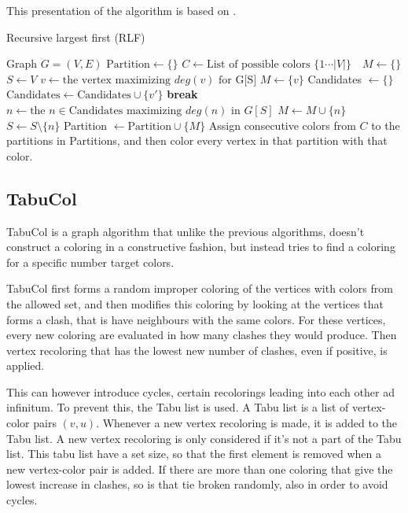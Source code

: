 \documentclass[a4paper]{article}
\newcommand{\algorithmicbreak}{\textbf{break}}
\newcommand{\BREAK}{\STATE \algorithmicbreak}
\begin{document}
This presentation of the algorithm is based on \cite{Constructive}.
\begin{algorithm}[H]
    \caption{Recursive largest first (RLF)}
  \begin{algorithmic}[1]
      \REQUIRE Graph $G = (V,E)$
      \STATE $\text{Partition} \leftarrow \{\}$
      \STATE $C \leftarrow \text{List of possible colors $\{1 \cdots |V| \}$ }$
      \STATE $M \leftarrow \{\}$
      \STATE $S \leftarrow V$
        \STATE $v \leftarrow \text{the vertex maximizing $deg(v)$ for G[S]} $
        \STATE $M \leftarrow \{v\}$
            \STATE Candidates $\leftarrow \{\}$
                    \STATE $\text{Candidates} \leftarrow \text{Candidates}
                    \cup \{v'\}$
                \ENDIF
            \ENDFOR
                \BREAK
            \ENDIF
            \STATE $n \leftarrow \text{the $n \in \text{Candidates}$ maximizing $deg(n)$ in $G[S]$}$ 
            \STATE $M \leftarrow M \cup \{n\}$
            \STATE $S \leftarrow S \setminus \{n\}$
        \ENDWHILE
        \STATE Partition $\leftarrow \text{Partition} \cup \{M\}$ 
      \ENDWHILE
      \STATE Assign consecutive colors from $C$ to the partitions in Partitions,
      and then color every vertex in that partition with that color.
  \end{algorithmic}
\end{algorithm}

\subsection{TabuCol}

TabuCol is a graph algorithm that unlike the previous algorithms, doesn't
construct a coloring in a constructive fashion, but instead tries to find a
coloring for a specific number target colors.

TabuCol first forms a random improper coloring of the vertices with colors
from the allowed set, and then modifies this coloring by looking at the
vertices that forms a clash, that is have neighbours with the same colors. For
these vertices, every new coloring are evaluated in how many clashes they would
produce. Then vertex recoloring that has the lowest new number of clashes, even
if positive, is applied.

This can however introduce cycles, certain recolorings leading into each other
ad infinitum. To prevent this, the Tabu list is used. A Tabu list is a list of
vertex-color pairs $(v,u)$. Whenever a new vertex recoloring is made, it is
added to the Tabu list. A new vertex recoloring is only considered if it's not a
part of the Tabu list. This tabu list have a set size, so that the first element
is removed when a new vertex-color pair is added. If there are more than one
coloring that give the lowest increase in clashes, so is that tie broken
randomly, also in order to avoid cycles.
\end{document}
